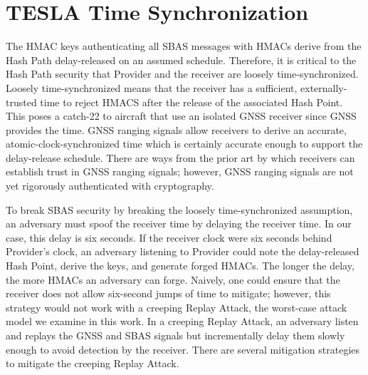 \documentclass[letterpaper,times]{IONconf/IONconf}
\begin{document}
\section{TESLA Time Synchronization} \label{sec:tesla_time_synchronization}

	The HMAC keys authenticating all SBAS messages with HMACs derive from the Hash Path delay-released on an assumed schedule.
	Therefore, it is critical to the Hash Path security that Provider and the receiver are loosely time-synchronized.
	Loosely time-synchronized means that the receiver has a sufficient, externally-trusted time to reject HMACS after the release of the associated Hash Point.
	This poses a catch-22 to aircraft that use an isolated GNSS receiver since GNSS provides the time.
	GNSS ranging signals allow receivers to derive an accurate, atomic-clock-synchronized time which is certainly accurate enough to support the delay-release schedule.
	There are ways from the prior art by which receivers can establish trust in GNSS ranging signals\cite{Psiaki2016, Fernandez-Hernandez2018}; however, GNSS ranging signals are not yet rigorously authenticated with cryptography.

	To break SBAS security by breaking the loosely time-synchronized assumption, an adversary must spoof the receiver time by delaying the receiver time.
	In our case, this delay is six seconds.
	If the receiver clock were six seconds behind Provider's clock, an adversary listening to Provider could note the delay-released Hash Point, derive the keys, and generate forged HMACs.
	The longer the delay, the more HMACs an adversary can forge.
	Naively, one could ensure that the receiver does not allow six-second jumps of time to mitigate; however, this strategy would not work with a creeping Replay Attack, the worst-case attack model we examine in this work.
	In a creeping Replay Attack, an adversary listen and replays the GNSS and SBAS signals but incrementally delay them slowly enough to avoid detection by the receiver.
	There are several mitigation strategies to mitigate the creeping Replay Attack.
\end{document}

